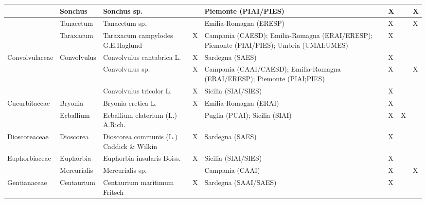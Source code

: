 \documentclass[main.tex]{subfiles}
\begin{document}
        \begin{table}[!ht]
        \centering
    \begin{tabular}[\footnotesize]{|p{2.2cm}|p{2.2cm}|p{2.2cm}|p{1.1cm}|p{1.6cm}|p{0.8cm}|p{1cm}|p{0.8cm}|}
    \hline
        ~ & Sonchus & Sonchus sp. & ~ & Piemonte (PIAI/PIES) & X & ~ & X \\ \hline
        ~ & Tanacetum & Tanacetum sp. & ~ & Emilia-Romagna (ERESP) & X & ~ & X \\ \hline
        ~ & Taraxacum & Taraxacum campylodes G.E.Haglund & X & Campania (CAESD); Emilia-Romagna (ERAI/ERESP); Piemonte (PIAI/PIES); Umbria (UMAI;UMES) & X & ~ & ~ \\ \hline
        Convolvulaceae & Convolvulus  & Convolvulus cantabrica L. & X & Sardegna (SAES) & X & ~ & ~ \\ \hline
        ~ & ~ & Convolvulus sp. & X & Campania (CAAI/CAESD); Emilia-Romagna (ERAI/ERESP); Piemonte (PIAI;PIES) & X & ~ & X \\ \hline
        ~ & ~ & Convolvulus tricolor L. & X & Sicilia (SIAI/SIES) & X & ~ & ~ \\ \hline
        Cucurbitaceae & Bryonia & Bryonia cretica L. & X & Emilia-Romagna (ERAI) & X & ~ & ~ \\ \hline
        ~ & Ecballium & Ecballium elaterium (L.) A.Rich. & ~ & Puglia (PUAI); Sicilia (SIAI) & X & X & ~ \\ \hline
        Dioscoreaceae & Dioscorea & Dioscorea communis (L.) Caddick \& Wilkin & X & Sardegna (SAES) & X & ~ & ~ \\ \hline
        Euphorbiaceae & Euphorbia & Euphorbia insularis Boiss. & X & Sicilia (SIAI/SIES) & X & ~ & ~ \\ \hline
        ~ & Mercurialis  & Mercurialis sp. & ~ & Campania (CAAI) & X & ~ & X \\ \hline
        Gentianaceae & Centaurium & Centaurium maritimum Fritsch & X & Sardegna (SAAI/SAES) & X & ~ & ~ \\ \hline
            \end{tabular}
    \end{table}
    
    \clearpage
        
\end{document}
